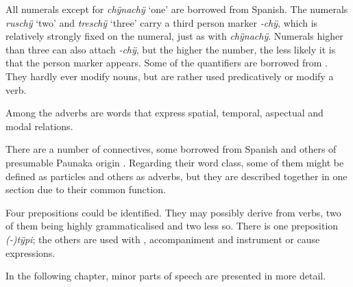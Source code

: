 All numerals except for \textit{chÿnachÿ} ‘one’ are borrowed from Spanish. The numerals \textit{ruschÿ} ‘two’ and \textit{treschÿ} ‘three’ carry a third person marker \textit{-chÿ}, which is relatively strongly fixed on the numeral, just as with \textit{chÿnachÿ}. Numerals higher than three can also attach \textit{-chÿ}, but the higher the number, the less likely it is that the person marker appears. Some of the quantifiers are borrowed from . They hardly ever modify nouns, but are rather used predicatively or modify a verb.

Among the adverbs are words that express spatial, temporal, aspectual and modal relations. 

There are a number of connectives, some borrowed from Spanish and others of presumable Paunaka origin \citep[cf.][]{DanielsenTerhart2015}. Regarding their word class, some of them might be defined as particles and others as adverbs, but they are described together in one section due to their common function.

Four prepositions could be identified. They may possibly derive from verbs, two of them being highly grammaticalised and two less so. There is one  preposition \textit{(-)tÿpi}; the others are used with , accompaniment and instrument or cause expressions.

In the following chapter, minor parts of speech are presented in more detail.


